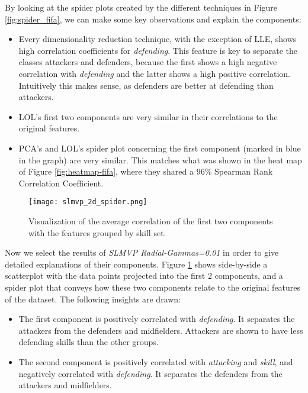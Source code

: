 By looking at the spider plots created by the different techniques in Figure \ref{fig:spider_fifa}, we can make some key observations and explain the components:

\begin{itemize}
    \item Every dimensionality reduction technique, with the exception of LLE, shows high correlation coefficients for \textit{defending}. This feature is key to separate the classes attackers and defenders, because the first shows a high negative correlation with \textit{defending} and the latter shows a high positive correlation. Intuitively this makes sense, as defenders are better at defending than attackers.
    \item LOL's first two components are very similar in their correlations to the original features.
    \item PCA's and LOL's spider plot concerning the first component (marked in blue in the graph) are very similar. This matches what was shown in the heat map of Figure \ref{fig:heatmap-fifa}, where they shared a 96\% Spearman Rank Correlation Coefficient.
\end{itemize}

\begin{figure}[!ht]
    \centering
    \texttt{[image: slmvp\_2d\_spider.png]}
    \caption{Visualization of the average correlation of the first two components with the features grouped by skill set.}
    \label{fig:2d_spider_fifa}
\end{figure}

Now we select the results of \textit{SLMVP Radial-Gammas=0.01} in order to give detailed explanations of their components. Figure \ref{fig:2d_spider_fifa} shows side-by-side a scatterplot with the data points projected into the first 2 components, and a spider plot that conveys how these two components relate to the original features of the dataset. The following insights are drawn:

\begin{itemize}
    \item The first component is positively correlated with \textit{defending}. It separates the attackers from the defenders and midfielders. Attackers are shown to have less defending skills than the other groups.
    \item The second component is positively correlated with \textit{attacking} and \textit{skill}, and negatively correlated with \textit{defending}. It separates the defenders from the attackers and midfielders.
\end{itemize}



